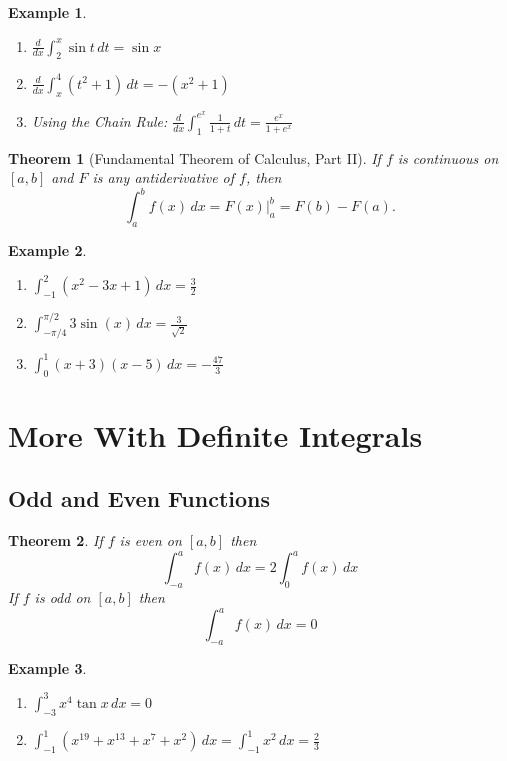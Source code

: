 \documentclass[letterpaper, 11pt, openany]{book}
\theoremstyle{mytheoremstyle}
\newtheorem{theorem}{Theorem}[section]
\theoremstyle{myexamplestyle}
\newtheorem{example}{Example}[section]
\begin{document}
\begin{example}\label{e:ftoc-ptI}
    \begin{enumerate}
        \item \(\displaystyle \frac{d}{dx} \int_2^x \sin t \, dt = \sin x\)
        \item \(\displaystyle \frac{d}{dx} \int_x^4 (t^2 + 1) \, dt = -(x^2 + 1)\)
        \item Using the Chain Rule: \(\displaystyle \frac{d}{dx} \int_{1}^{e^x} \frac{1}{1 + t} \, dt = \frac{e^x}{1 + e^x}\)
    \end{enumerate}
\end{example}

\begin{theorem}[Fundamental Theorem of Calculus, Part II]\label{t:FTOC-II}
    If \(f\) is continuous on \([a,b]\) and \(F\) is any antiderivative of \(f\), then
    \[\int_a^b f(x) \, dx = F(x)\Big|_a^b = F(b) - F(a).\]
\end{theorem}

\begin{example}\label{e:ftoc-ptII}
    \begin{enumerate}
        \item \(\displaystyle \int_{-1}^2 \left(x^2-3 x+1\right) \, dx = \frac{3}{2}\)
        \item \(\displaystyle \int_{-\pi/4}^{\pi /2} 3 \sin (x) \, dx = \frac{3}{\sqrt{2}}\)
        \item \(\displaystyle \int_0^1 (x+3) (x-5) \, dx = -\frac{47}{3}\)
    \end{enumerate}
\end{example}

\section{More With Definite Integrals}

\subsection{Odd and Even Functions}
\begin{theorem}\label{t:odd-even-integrals}
    If \(f\) is even on \([a,b]\) then
    \[\int_{-a}^{a} f(x) \, dx = 2\int_{0}^{a} f(x) \, dx\]
    If \(f\) is odd on \([a,b]\) then
    \[\int_{-a}^{a} f(x) \, dx = 0\]
\end{theorem}

\begin{example}
    \begin{enumerate}
        \item \(\displaystyle \int_{-3}^{3} x^4 \tan x \, dx = 0\) \faSmile
        \item \(\displaystyle \int_{-1}^{1} \left(x^{19} + x^{13 }+ x^{7} + x^2\right) \, dx = \int_{-1}^{1} x^2 \, dx = \frac{2}{3}\)
    \end{enumerate}
\end{example}
\end{document}
